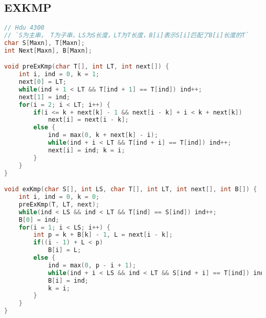 ﻿\subsection{EXKMP}
\begin{lstlisting}[language=C++]
// Hdu 4300
// `S为主串， T为子串，LS为S长度，LT为T长度，B[i]表示S[i]匹配了B[i]长度的T`
char S[Maxn], T[Maxn];
int Next[Maxn], B[Maxn];

void preExKmp(char T[], int LT, int next[]) {
    int i, ind = 0, k = 1;
    next[0] = LT;
    while(ind + 1 < LT && T[ind + 1] == T[ind]) ind++;
    next[1] = ind;
    for(i = 2; i < LT; i++) {
        if(i <= k + next[k] - 1 && next[i - k] + i < k + next[k])
            next[i] = next[i - k];
        else {
            ind = max(0, k + next[k] - i);
            while(ind + i < LT && T[ind + i] == T[ind]) ind++;
            next[i] = ind; k = i;
        }
    }
}

void exKmp(char S[], int LS, char T[], int LT, int next[], int B[]) {
    int i, ind = 0, k = 0;
    preExKmp(T, LT, next);
    while(ind < LS && ind < LT && T[ind] == S[ind]) ind++;
    B[0] = ind;
    for(i = 1; i < LS; i++) {
        int p = k + B[k] - 1, L = next[i - k];
        if((i - 1) + L < p)
            B[i] = L;
        else {
            ind = max(0, p - i + 1);
            while(ind + i < LS && ind < LT && S[ind + i] == T[ind]) ind++;
            B[i] = ind;
            k = i;
        }
    }
}
	
\end{lstlisting}
